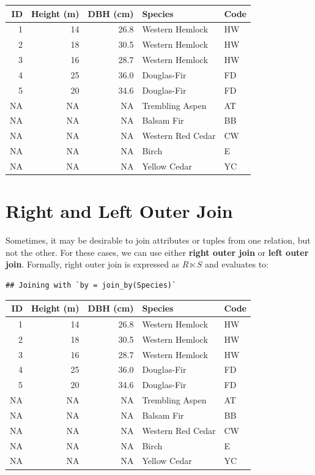 \documentclass[
]{book}
\begin{document}
\begin{tabular}{rrrll}
\toprule
ID & Height (m) & DBH (cm) & Species & Code\\
\midrule
1 & 14 & 26.8 & Western Hemlock & HW\\
2 & 18 & 30.5 & Western Hemlock & HW\\
3 & 16 & 28.7 & Western Hemlock & HW\\
4 & 25 & 36.0 & Douglas-Fir & FD\\
5 & 20 & 34.6 & Douglas-Fir & FD\\
\addlinespace
NA & NA & NA & Trembling Aspen & AT\\
NA & NA & NA & Balsam Fir & BB\\
NA & NA & NA & Western Red Cedar & CW\\
NA & NA & NA & Birch & E\\
NA & NA & NA & Yellow Cedar & YC\\
\bottomrule
\end{tabular}

\hypertarget{right-and-left-outer-join}{%
\section{Right and Left Outer Join}\label{right-and-left-outer-join}}

Sometimes, it may be desirable to join attributes or tuples from one relation, but not the other. For these cases, we can use either \textbf{right outer join} or \textbf{left outer join}. Formally, right outer join is expressed as \(R⋉S\) and evaluates to:

\begin{verbatim}
## Joining with `by = join_by(Species)`
\end{verbatim}

\begin{tabular}{rrrll}
\toprule
ID & Height (m) & DBH (cm) & Species & Code\\
\midrule
1 & 14 & 26.8 & Western Hemlock & HW\\
2 & 18 & 30.5 & Western Hemlock & HW\\
3 & 16 & 28.7 & Western Hemlock & HW\\
4 & 25 & 36.0 & Douglas-Fir & FD\\
5 & 20 & 34.6 & Douglas-Fir & FD\\
\addlinespace
NA & NA & NA & Trembling Aspen & AT\\
NA & NA & NA & Balsam Fir & BB\\
NA & NA & NA & Western Red Cedar & CW\\
NA & NA & NA & Birch & E\\
NA & NA & NA & Yellow Cedar & YC\\
\bottomrule
\end{tabular}
\end{document}
